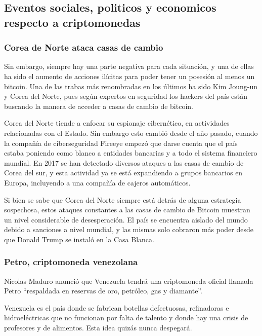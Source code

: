 \documentclass[12pt,letterpaper]{article}
\begin{document}
            \subsection*{Eventos sociales, politicos y economicos respecto a criptomonedas}
           	\subsubsection*{Corea de Norte ataca casas de cambio}
           	Sin embargo, siempre hay una parte negativa para cada situaci\'on, y una de ellas ha sido el aumento de acciones il\'icitas para poder tener un posesi\'on al menos un bitcoin. Una de las trabas m\'as renombradas en los \'ultimos ha sido Kim Joung-un y Corea del Norte, pues seg\'un expertos en seguridad los hackers del pa\'is est\'an buscando la manera de acceder a casas de cambio de bitcoin.

Corea del Norte tiende a enfocar su espionaje cibern\'etico, en actividades relacionadas con el Estado. Sin embargo esto cambi\'o desde el año pasado, cuando la compañ\'ia de ciberseguridad Fireeye empez\'o que darse cuenta que el pa\'is estaba poniendo como blanco a entidades bancarias y a todo el sistema financiero mundial. En 2017 se han detectado diversos ataques a las casas de cambio de Corea del sur, y esta actividad ya se est\'a expandiendo a grupos bancarios en Europa, incluyendo a una compañ\'ia de cajeros autom\'aticos.
               
               Si bien se sabe que Corea del Norte siempre est\'a detr\'as de alguna estrategia sospechosa, estos ataques constantes a las casas de cambio de Bitcoin muestran un nivel considerable de desesperaci\'on. El pa\'is se encuentra aislado del mundo debido a sanciones a nivel mundial, y las mismas solo cobraron m\'as poder desde que Donald Trump se instal\'o en la Casa Blanca.
              
\subsubsection*{Petro, criptomoneda venezolana}
Nicolas Maduro anunció que Venezuela tendrá una criptomoneda oficial llamada Petro “respaldada en reservas de oro, petróleo, gas y diamante”.

Venezuela es el país donde se fabrican botellas defectuosas, refinadoras e hidroeléctricas que no funcionan por falta de talento y donde hay una crisis de profesores y de alimentos. Esta idea quizás nunca despegará.
\end{document}
